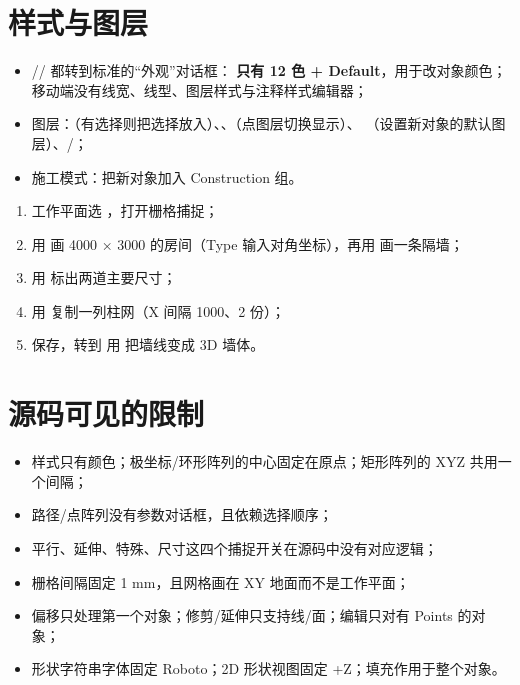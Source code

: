 \section{样式与图层}

\begin{itemize}
  \item {}// 都转到标准的“外观”对话框：
        \textbf{只有 12 色 + Default}，用于改对象颜色；移动端没有线宽、线型、图层样式与注释样式编辑器；
  \item 图层：（有选择则把选择放入）、、（点图层切换显示）、
        （设置新对象的默认图层）、/；
  \item 施工模式：把新对象加入 Construction 组。
\end{itemize}

\begin{practice}[练习：带标注的平面布置图]
\begin{enumerate}
  \item 工作平面选 ，打开栅格捕捉；
  \item 用  画 4000 × 3000 的房间（Type 输入对角坐标），再用  画一条隔墙；
  \item 用  标出两道主要尺寸；
  \item 用  复制一列柱网（X 间隔 1000、2 份）；
  \item 保存，转到  用  把墙线变成 3D 墙体。
\end{enumerate}
\end{practice}

\section{源码可见的限制}

\begin{itemize}
  \item 样式只有颜色；极坐标/环形阵列的中心固定在原点；矩形阵列的 XYZ 共用一个间隔；
  \item 路径/点阵列没有参数对话框，且依赖选择顺序；
  \item 平行、延伸、特殊、尺寸这四个捕捉开关在源码中没有对应逻辑；
  \item 栅格间隔固定 1 mm，且网格画在 XY 地面而不是工作平面；
  \item 偏移只处理第一个对象；修剪/延伸只支持线/面；编辑只对有 Points 的对象；
  \item 形状字符串字体固定 Roboto；2D 形状视图固定 +Z；填充作用于整个对象。
\end{itemize}
